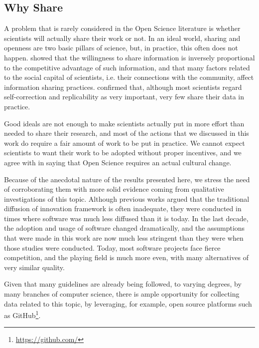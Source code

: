 \documentclass[12pt]{article}
\begin{document}
\subsection{Why Share}
\label{sec:org10ba7ef}
A problem that is rarely considered in the Open Science literature is whether scientists will actually share their work or not. In an ideal world, sharing and openness are two basic pillars of science, but, in practice, this often does not happen. \cite{infoshar} showed that the willingness to share information is inversely proportional to the competitive advantage of such information, and that many factors related to the social capital of scientists, i.e. their connections with the community, affect information sharing practices. \cite{opendata} confirmed that, although most scientists regard self-correction and replicability as very important, very few share their data in practice.

Good ideals are not enough to make scientists actually put in more effort than needed to share their research, and most of the actions that we discussed in this work do require a fair amount of work to be put in practice. We cannot expect scientists to want their work to be adopted without proper incentives, and we agree with \cite{fiveopenscience} in saying that Open Science requires an actual cultural change.

Because of the anecdotal nature of the results presented here, we stress the need of corroborating them with more solid evidence coming from qualitative investigations of this topic. Although previous works argued that the traditional diffusion of innovation framework is often inadequate, they were conducted in times where software was much less diffused than it is today. In the last decade, the adoption and usage of software changed dramatically, and the assumptions that were made in this work are now much less stringent than they were when those studies were conducted. Today, most software projects face fierce competition, and the playing field is much more even, with many alternatives of very similar quality.

Given that many guidelines are already being followed, to varying degrees, by many branches of computer science, there is ample opportunity for collecting data related to this topic, by leveraging, for example, open source platforms such as GitHub\footnote{\url{https://github.com/}}.



\end{document}
